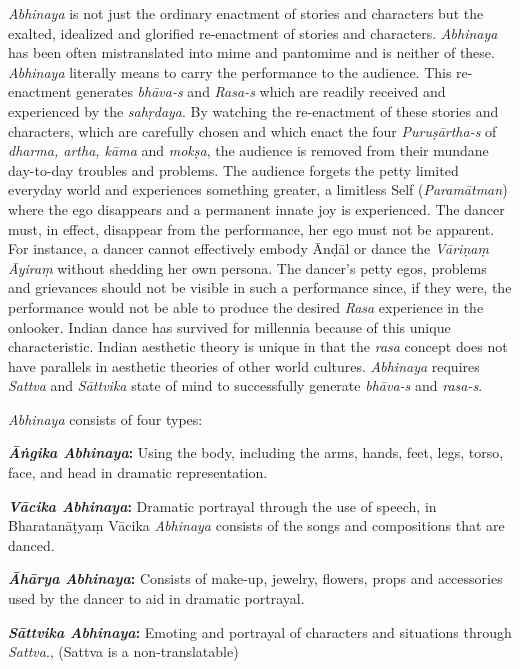\textit{Abhinaya} is not just the ordinary enactment of stories and characters but the exalted, idealized and glorified re-enactment of stories and characters. \textit{Abhinaya} has been often mistranslated into mime and pantomime and is neither of these. \textit{Abhinaya} literally means to carry the performance to the audience. This re-enactment generates \textit{bhāva-s} and \textit{Rasa-s} which are readily received and experienced by the \textit{sahṛdaya}. By watching the re-enactment of these stories and characters, which are carefully chosen and which enact the four \textit{Puruṣārtha-s} of \textit{dharma, artha, kāma} and \textit{mokṣa}, the audience is removed from their mundane day-to-day troubles and problems. The audience forgets the petty limited everyday world and experiences something greater, a limitless Self (\textit{Paramātman}) where the ego disappears and a permanent innate joy is experienced. The dancer must, in effect, disappear from the performance, her ego must not be apparent. For instance, a dancer cannot effectively embody Ānḍāl or dance the \textit{Vāriṇaṃ Āyiraṃ }without shedding her own persona. The dancer’s petty egos, problems and grievances should not be visible in such a performance since, if they were, the performance would not be able to produce the desired \textit{Rasa} experience in the onlooker. Indian dance has survived for millennia because of this unique characteristic. Indian aesthetic theory is unique in that the \textit{rasa} concept does not have parallels in aesthetic theories of other world cultures. \textit{Abhinaya} requires \textit{Sattva} and \textit{Sāttvika} state of mind to successfully generate \textit{bhāva-s} and \textit{rasa-s}.

\textit{Abhinaya} consists of four types:

\textbf{\textit{Āṅgika Abhinaya}:} Using the body, including the arms, hands, feet, legs, torso, face, and head in dramatic representation.

\textbf{\textit{Vācika Abhinaya}:} Dramatic portrayal through the use of speech, in Bharatanāṭyaṃ Vācika \textit{Abhinaya} consists of the songs and compositions that are danced.

\textbf{\textit{Āhārya Abhinaya}:} Consists of make-up, jewelry, flowers, props and accessories used by the dancer to aid in dramatic portrayal.

\textbf{\textit{Sāttvika Abhinaya}:} Emoting and portrayal of characters and situations through \textit{Sattva}., (Sattva is a non-translatable)

